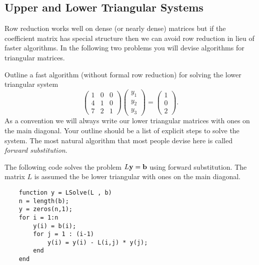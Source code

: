 \subsection{Upper and Lower Triangular Systems}
Row reduction works well on dense (or nearly dense) matrices but if the coefficient matrix
has special structure then we can avoid row reduction in lieu of faster algorithms. In the
following two problems you will devise algorithms for triangular matrices.

\begin{problem}
    Outline a fast algorithm (without formal row reduction) for solving the lower triangular system
    \[ \begin{pmatrix} 1 & 0 & 0 \\ 4 & 1 & 0 \\ 7 & 2 & 1 \end{pmatrix} \begin{pmatrix}
        y_1 \\ y_2 \\ y_3 \end{pmatrix} = \begin{pmatrix} 1 \\ 0 \\ 2\end{pmatrix}. \]
    As a convention we will always write our lower triangular matrices with ones on the
    main diagonal.  Your outline should be a list of explicit steps to solve the system.
    The most natural algorithm that most people devise here is called {\it forward
    substitution}.
\end{problem}


\begin{technique}\label{tech:lsolve}
    The following code solves the problem $L {\bf y} = {\bf b}$ using forward
    substitution.  The matrix $L$ is assumed the be lower triangular with ones on the main
    diagonal.
    \begin{verbatim}
    function y = LSolve(L , b)
    n = length(b);
    y = zeros(n,1);
    for i = 1:n
        y(i) = b(i);
        for j = 1 : (i-1)
            y(i) = y(i) - L(i,j) * y(j);
        end
    end
    \end{verbatim}
\end{technique}

